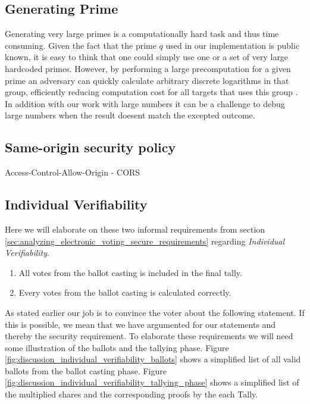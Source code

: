 \subsection{Generating Prime}
Generating very large primes is a computationally hard task and thus time consuming. Given the fact
that the prime $q$ used in our implementation is public known, it is easy to think that one could simply
use one or a set of very large hardcoded primes. However, by performing a large precomputation for a given
prime an adversary can quickly calculate arbitrary discrete logarithms in that group, efficiently reducing 
computation cost for all targets that uses this group \cite{Adrian:2015:IFS:2810103.2813707}. In addition with our work with large numbers it can be a challenge to debug large numbers when the result doesent match the excepted outcome.

\subsection{Same-origin security policy}
Access-Control-Allow-Origin
- CORS



\subsection{Individual Verifiability} \label{sec:discussion_individual_verifiability}
Here we will elaborate on these two informal requirements from section \ref{sec:analyzing_electronic_voting_secure_requirements} regarding \textit{Individual Verifiability}. 

\begin{enumerate}
    \item All votes from the ballot casting is included in the final tally.
    \item Every votes from the ballot casting is calculated correctly.
\end{enumerate}

\noindent
As stated earlier our job is to convince the voter about the following statement. If this is possible, we mean that we have argumented for our statements and thereby the security requirement. To elaborate these requirements we will need some illustration of the ballots and the tallying phase. Figure \ref{fig:discussion_individual_verifiability_ballots} shows a simplified list of all valid ballots from the ballot casting phase. Figure \ref{fig:discussion_individual_verifiability_tallying_phase} shows a simplified list of the multiplied shares and the corresponding proofs by the each Tally.\\

